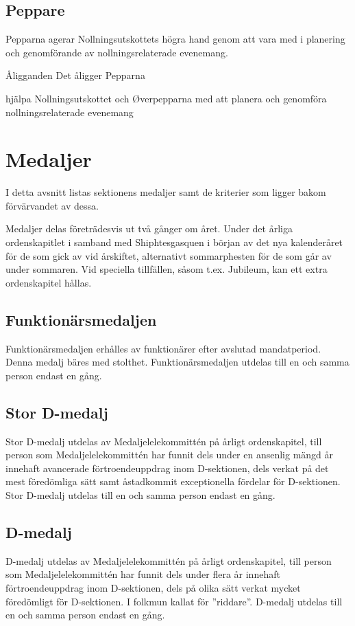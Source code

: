 \documentclass[pdfbookmarks,a4paper,11pt]{article}
\newcommand{\funktionar}[1]{%
  \subsection*{#1}\par
  \addcontentsline{toc}{subsection}{#1}}
\newlength{\itemcollength}
\newenvironment{reglemlista}{%
  \begin{list}{}{%
      \setlength{\labelwidth}{\itemcollength}%
      \setlength{\leftmargin}{\labelwidth + \labelsep}%
      \renewcommand{\makelabel}[1]{%
        \raisebox{0pt}[1ex][0pt]{%
          \makebox[\labelwidth][l]{%
            \parbox[t]{\itemcollength}{%
              \raggedright\hspace{0pt}##1}}}\hfill}%
      }}{%
  \end{list}}
\begin{document}
\funktionar{Peppare}
Pepparna agerar Nollningsutskottets högra hand genom att vara med i planering
och genomförande av nollningsrelaterade evenemang.
\begin{reglemlista}
	\item[Åligganden]
      Det åligger Pepparna
      \begin{attlista}
        \item hjälpa Nollningsutskottet och \O verpepparna med att planera och genomföra nollningsrelaterade evenemang
      \end{attlista}

  \end{reglemlista}

\section{Medaljer}

I detta avsnitt listas sektionens medaljer samt de kriterier som ligger bakom förvärvandet av dessa.

Medaljer delas företrädesvis ut två gånger om året. Under det årliga ordenskapitlet i samband med Shiphtesgasquen i början av det nya kalenderåret för de som gick av vid årskiftet, alternativt sommarphesten för de som går av under sommaren. Vid speciella tillfällen, såsom t.ex. Jubileum, kan ett extra ordenskapitel hållas.

\subsection{Funktionärsmedaljen}
Funktionärsmedaljen erhålles av funktionärer efter avslutad mandatperiod. Denna medalj bäres med stolthet. Funktionärsmedaljen utdelas till en och samma person endast en gång.

\subsection{Stor D-medalj}
Stor D-medalj utdelas av Medaljelelekommittén på årligt ordenskapitel, till person som Medaljelelekommittén har funnit dels under en ansenlig mängd år innehaft avancerade förtroendeuppdrag inom D-sektionen, dels verkat på det mest föredömliga sätt samt åstadkommit exceptionella fördelar för D-sektionen. Stor D-medalj utdelas till en och samma person endast en gång.

\subsection{D-medalj}
D-medalj utdelas av Medaljelelekommittén på årligt ordenskapitel, till person som Medaljelelekommittén har funnit dels under flera år innehaft förtroendeuppdrag inom D-sektionen, dels på olika sätt verkat mycket föredömligt för D-sektionen. I folkmun kallat för ''riddare''. D-medalj utdelas till en och samma person endast en gång.
\end{document}
